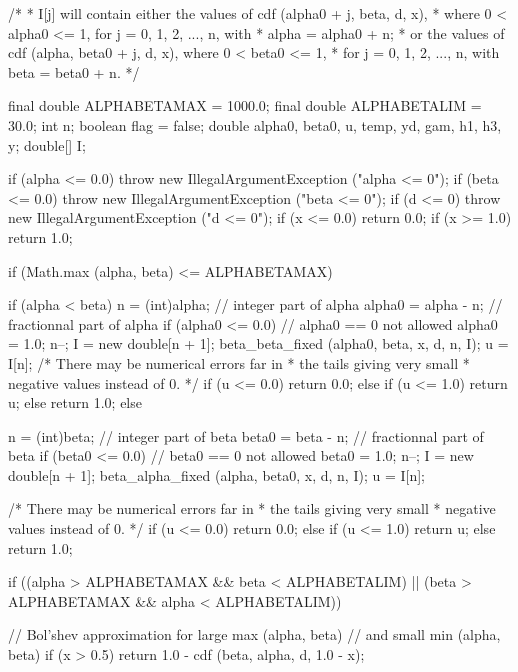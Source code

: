 \begin{code}
\begin{hide}
{   /*
    * I[j] will contain either the values of cdf (alpha0 + j, beta, d, x),
    * where 0 < alpha0 <= 1, for j = 0, 1, 2, ..., n,  with
    * alpha = alpha0 + n;
    * or the values of cdf (alpha, beta0 + j, d, x), where 0 < beta0 <= 1,
    * for j = 0, 1, 2, ..., n, with beta = beta0 + n.
    */

      final double ALPHABETAMAX = 1000.0;
      final double ALPHABETALIM = 30.0;
      int n;
      boolean flag = false;
      double alpha0, beta0, u, temp, yd, gam, h1, h3, y;
      double[] I;

      if (alpha <= 0.0)
        throw new IllegalArgumentException ("alpha <= 0");
      if (beta <= 0.0)
        throw new IllegalArgumentException ("beta <= 0");
      if (d <= 0)
        throw new IllegalArgumentException ("d <= 0");
      if (x <= 0.0)
         return 0.0;
      if (x >= 1.0)
         return 1.0;

      if (Math.max (alpha, beta) <= ALPHABETAMAX) {
         if (alpha < beta) {
            n = (int)alpha;                   // integer part of alpha
            alpha0 = alpha - n;              // fractionnal part of alpha
            if (alpha0 <= 0.0) {         // alpha0 == 0 not allowed
               alpha0 = 1.0;
               n--;
            }
            I = new double[n + 1];
            beta_beta_fixed (alpha0, beta, x, d, n, I);
            u = I[n];
            /* There may be numerical errors far in
             * the tails giving very small
             *  negative values instead of 0. */
            if (u <= 0.0)
               return 0.0;
            else if (u <= 1.0)
               return u;
            else
               return 1.0;
         }
         else {
            n = (int)beta;                   // integer part of beta
            beta0 = beta - n;              // fractionnal part of beta
            if (beta0 <= 0.0) {         // beta0 == 0 not allowed
               beta0 = 1.0;
               n--;
            }
            I = new double[n + 1];
            beta_alpha_fixed (alpha, beta0, x, d, n, I);
            u = I[n];

            /* There may be numerical errors far in
             * the tails giving very small
             * negative values instead of 0. */
            if (u <= 0.0)
               return 0.0;
            else if (u <= 1.0)
               return u;
            else
               return 1.0;
         }
      }

      if ((alpha > ALPHABETAMAX && beta < ALPHABETALIM) ||
          (beta > ALPHABETAMAX && alpha < ALPHABETALIM)) {
         // Bol'shev approximation for large max (alpha, beta)
         // and small min (alpha, beta)
         if (x > 0.5)
            return 1.0 - cdf (beta, alpha, d, 1.0 - x);

}}
\end{hide}
\end{code}
